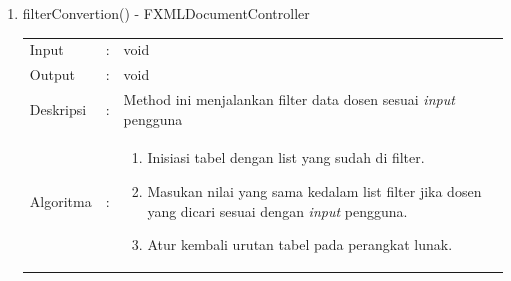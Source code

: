 \begin{enumerate}
	\item filterConvertion() - FXMLDocumentController\\
	\begin{tabular}{l c p{9cm}}
		Input & : & void\\ 
		Output & : & void \\ 
		Deskripsi & : & Method ini menjalankan filter data dosen sesuai \textit{input} pengguna\\
		Algoritma & : & 
			\begin{enumerate}
				\item Inisiasi tabel dengan list yang sudah di filter.
				\item Masukan nilai yang sama kedalam list filter jika dosen yang dicari sesuai dengan \textit{input} pengguna.
				\item Atur kembali urutan tabel pada perangkat lunak.
			\end{enumerate}
		\end{tabular}	
\end{enumerate}
